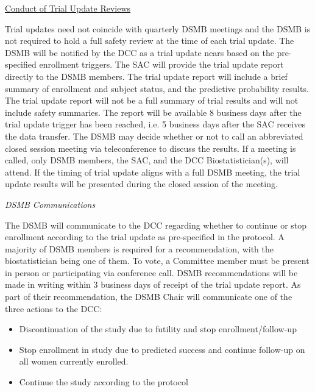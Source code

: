 \documentclass[12pt]{article}
\begin{document}
\vspace{0.4cm}
\noindent \underline{Conduct of Trial Update Reviews}

Trial updates need not coincide with quarterly DSMB meetings and the DSMB is 
not required to hold a full safety review at the time of each trial update.  
The DSMB will be notified by the DCC as a trial update nears based on the 
pre-specified enrollment triggers.  The SAC will provide the trial update 
report directly to the DSMB members. The trial update report will include a 
brief summary of enrollment and subject status, and the predictive 
probability results. The trial update report will not be a full summary of 
trial results and will not include safety summaries.  The report will be 
available 8 business days after the trial update trigger has been reached, 
i.e. 5 business days after the SAC receives the data transfer.   The DSMB 
may decide whether or not to call an abbreviated closed session meeting via 
teleconference to discuss the results.  If a meeting is called, only DSMB 
members, the SAC, and the DCC Biostatistician(s), will attend.
If the timing of trial update aligns with a full DSMB meeting, the trial 
update results will be presented during the closed session of the meeting. 

\vspace{0.4cm}
\noindent \textit{DSMB Communications}

The DSMB will communicate to the DCC regarding whether to continue or stop 
enrollment according to the trial update as pre-specified in the protocol. A 
majority of DSMB members is required for a recommendation, with the 
biostatistician being one of them. To vote, a Committee member must be 
present in person or participating via conference call.  DSMB 
recommendations will be made in writing within 3 business days of receipt  
of the trial update report.  As part of their recommendation, the DSMB Chair 
will communicate one of the three actions to the DCC:
\begin{itemize}
\item Discontinuation of the study due to futility and stop enrollment/follow-up
\item Stop enrollment in study due to predicted success and continue follow-up on all women currently enrolled.
\item Continue the study according to the protocol 
\end{itemize}
\end{document}
